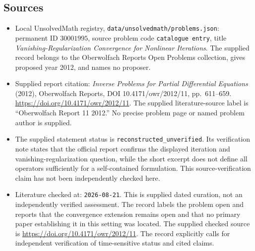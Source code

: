 \documentclass[11pt]{article}
\begin{document}
\subsection{Sources}
\begin{itemize}
\item Local UnsolvedMath registry, \texttt{data/unsolvedmath/problems.json}: permanent ID \(30001995\), source problem code \texttt{catalogue entry}, title \emph{Vanishing-Regularization Convergence for Nonlinear Iterations}. The supplied record belongs to the Oberwolfach Reports Open Problems collection, gives proposed year 2012, and names no proposer.
\item Supplied report citation: \emph{Inverse Problems for Partial Differential Equations} (2012), Oberwolfach Reports, DOI 10.4171/owr/2012/11, pp.\ 611--659. \url{https://doi.org/10.4171/owr/2012/11}. The supplied literature-source label is ``Oberwolfach Report 11 2012.'' No precise problem page or named problem author is supplied.
\item The supplied statement status is \texttt{reconstructed\_unverified}. Its verification note states that the official report confirms the displayed iteration and vanishing-regularization question, while the short excerpt does not define all operators sufficiently for a self-contained formulation. This source-verification claim has not been independently checked here.
\item Literature checked at: \texttt{2026-08-21}. This is supplied dated curation, not an independently verified assessment. The record labels the problem open and reports that the convergence extension remains open and that no primary paper establishing it in this setting was located. The supplied checked source is \url{https://doi.org/10.4171/owr/2012/11}. The record explicitly calls for independent verification of time-sensitive status and cited claims.
\end{itemize}
\end{document}

